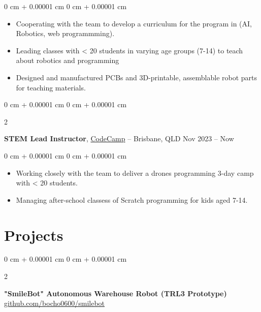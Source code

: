 \documentclass[10pt, letterpaper]{article}
\newenvironment{highlights}{
    \begin{itemize}[
        topsep=0.10 cm,
        parsep=0.10 cm,
        partopsep=0pt,
        itemsep=0pt,
        leftmargin=0 cm + 10pt
    ]
}{
    \end{itemize}
} %
\newenvironment{onecolentry}{
    \begin{adjustwidth}{
        0 cm + 0.00001 cm
    }{
        0 cm + 0.00001 cm
    }
}{
    \end{adjustwidth}
} %
\newenvironment{twocolentry}[2][]{
    \onecolentry
    \def\secondColumn{#2}
    \setcolumnwidth{\fill, 4.5 cm}
    \begin{paracol}{2}
}{
    \switchcolumn \raggedleft \secondColumn
    \end{paracol}
    \endonecolentry
} %
\begin{document}
\vspace{0.10 cm}
\begin{onecolentry}
      \begin{highlights}
            \item Cooperating with the team to develop a curriculum for the program in (AI,
            Robotics, web programmming).
            \item Leading classes with < 20 students in varying age groups (7-14) to teach about
            robotics and programming
            \item Designed and manufactured PCBs and 3D-printable, assemblable robot parts for
            teaching materials.
      \end{highlights}
\end{onecolentry}

\vspace{0.4 cm}

\begin{twocolentry}{
            Nov 2023 – Now
      }
      \textbf{STEM Lead Instructor}, \href{https://www.codecamp.com.au/}{CodeCamp} -- Brisbane, QLD\end{twocolentry}

\vspace{0.10 cm}
\begin{onecolentry}
      \begin{highlights}
            \item Working closely with the team to deliver a drones programming 3-day camp with <
            20 students.
            \item Managing after-school classess of Scratch programming for kids aged 7-14.

      \end{highlights}
\end{onecolentry}

\section{Projects}

\begin{twocolentry}{
            \href{https://github.com/bocho0600/smilebot}{github.com/bocho0600/smilebot}
      }
      \textbf{"SmileBot" Autonomous Warehouse Robot (TRL3 Prototype)}\end{twocolentry}
\end{document}
